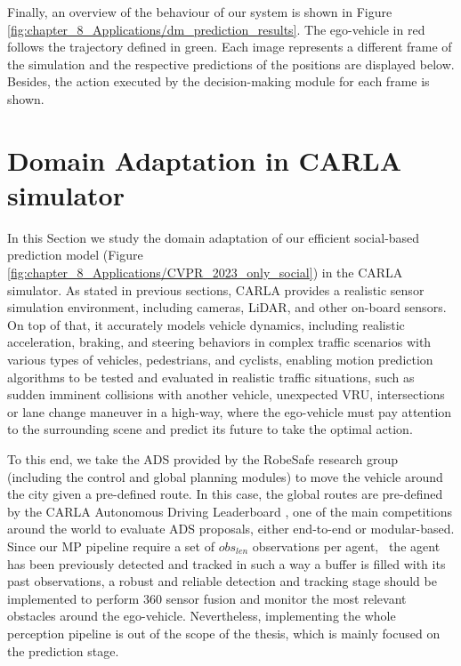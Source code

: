Finally, an overview of the behaviour of our system is shown in Figure \ref{fig:chapter_8_Applications/dm_prediction_results}. The ego-vehicle in red follows the trajectory defined in green. Each image represents a different frame of the simulation and the respective predictions of the positions are displayed below. Besides, the action executed by the decision-making module for each frame is shown.

\section{Domain Adaptation in CARLA simulator}
\label{sec:8_domain_adaptation_carla}

In this Section we study the domain adaptation of our efficient social-based prediction model (Figure \ref{fig:chapter_8_Applications/CVPR_2023_only_social}) in the CARLA simulator. As stated in previous sections, CARLA provides a realistic sensor simulation environment, including cameras, \ac{LiDAR}, and other on-board sensors. On top of that, it accurately models vehicle dynamics, including realistic acceleration, braking, and steering behaviors in complex traffic scenarios with various types of vehicles, pedestrians, and cyclists, enabling motion prediction algorithms to be tested and evaluated in realistic traffic situations, such as sudden imminent collisions with another vehicle, unexpected \ac{VRU}, intersections or lane change maneuver in a high-way, where the ego-vehicle must pay attention to the surrounding scene and predict its future to take the optimal action. 

To this end, we take the \ac{ADS} provided by the RobeSafe research group (including the control and global planning modules) to move the vehicle around the city given a pre-defined route. In this case, the global routes are pre-defined by the CARLA Autonomous Driving Leaderboard \cite{dosovitskiy2017carla}, one of the main competitions around the world to evaluate \ac{ADS} proposals, either end-to-end or modular-based. Since our \ac{MP} pipeline require a set of \textit{$obs_{len}$} observations per agent, \ie \ the agent has been previously detected and tracked in such a way a buffer is filled with its past observations, a robust and reliable detection and tracking stage should be implemented to perform 360 \degree sensor fusion and monitor the most relevant obstacles around the ego-vehicle. Nevertheless, implementing the whole perception pipeline is out of the scope of the thesis, which is mainly focused on the prediction stage.

